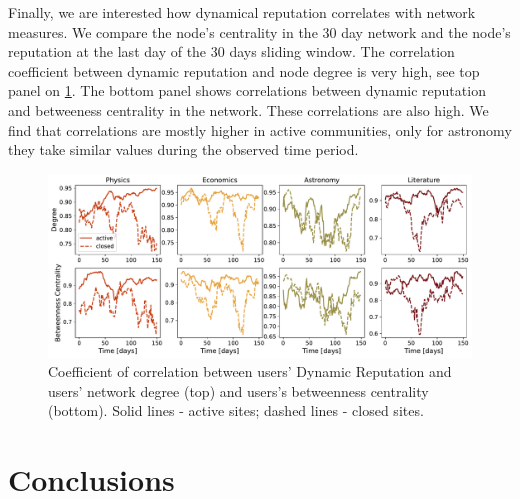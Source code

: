 Finally, we are interested how dynamical reputation correlates with network measures. We compare the node's centrality in the 30 day network and the node's reputation at the last day of the 30 days sliding window. The correlation coefficient between dynamic reputation and node degree is very high, see top panel on \ref{fig:dyn_rep_centrality}. The bottom panel shows correlations between dynamic reputation and betweeness centrality in the network. These correlations are also high. We find that correlations are mostly higher in active communities, only for astronomy they take similar values during the observed time period. 

\begin{figure}[H]
	\centering
	\includegraphics[width=\linewidth]{figures/stackexchange/correlations.pdf}
	\caption{Coefficient of correlation between users' Dynamic Reputation and users' network degree (top) and users's betweenness centrality (bottom). Solid lines - active sites; dashed lines - closed sites.}
	\label{fig:dyn_rep_centrality}
\end{figure}

\section{Conclusions}




